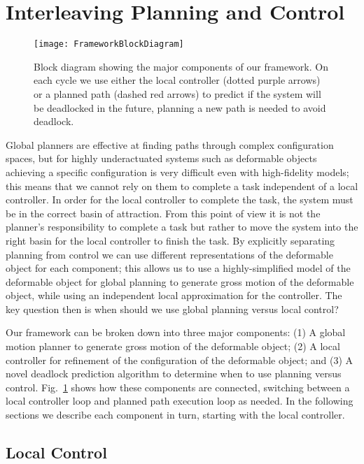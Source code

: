 \section{Interleaving Planning and Control}
\label{sec:main_framework_loop}

\begin{figure}[t]
    \centering
    \texttt{[image: FrameworkBlockDiagram]}
    \caption{Block diagram showing the major components of our framework. On each cycle we use either the local controller (dotted purple arrows) or a planned path (dashed red arrows) to predict if the system will be deadlocked in the future, planning a new path is needed to avoid deadlock.}
    \label{fig:main_loop_diagram}
\end{figure}

Global planners are effective at finding paths through complex configuration spaces, but for highly underactuated systems such as deformable objects achieving a specific configuration is very difficult even with high-fidelity models; this means that we cannot rely on them to complete a task independent of a local controller. In order for the local controller to complete the task, the system must be in the correct basin of attraction. From this point of view it is not the planner's responsibility to complete a task but rather to move the system into the right basin for the local controller to finish the task. By explicitly separating planning from control we can use different representations of the deformable object for each component; this allows us to use a highly-simplified model of the deformable object for global planning to generate gross motion of the deformable object, while using an independent local approximation for the controller. The key question then is when should we use global planning versus local control?

Our framework can be broken down into three major components: (1) A global motion planner to generate gross motion of the deformable object; (2) A local controller for refinement of the configuration of the deformable object; and (3) A novel deadlock prediction algorithm to determine when to use planning versus control. Fig.~\ref{fig:main_loop_diagram} shows how these components are connected, switching between a local controller loop and planned path execution loop as needed. In the following sections we describe each component in turn, starting with the local controller.


\subsection{Local Control}
\label{sec:local_control}

